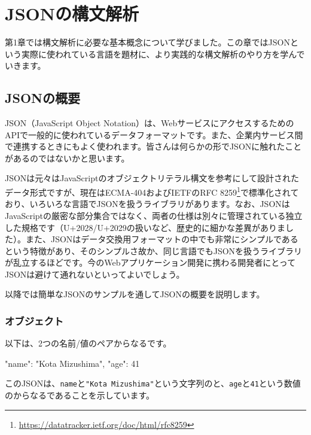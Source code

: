 \thispagestyle{empty}
\chapter{JSONの構文解析}\label{ch02}

第1章では構文解析に必要な基本概念について学びました。この章ではJSONという実際に使われている言語を題材に、より実践的な構文解析のやり方を学んでいきます。

\section{JSONの概要}

JSON（JavaScript Object
Notation）は、WebサービスにアクセスするためのAPIで一般的に使われているデータフォーマットです。また、企業内サービス間で連携するときにもよく使われます。皆さんは何らかの形でJSONに触れたことがあるのではないかと思います。

JSONは元々はJavaScriptのオブジェクトリテラル構文を参考にして設計されたデータ形式ですが、現在はECMA-404およびIETFのRFC 8259\footnote{\url{https://datatracker.ietf.org/doc/html/rfc8259}}で標準化されており、いろいろな言語でJSONを扱うライブラリがあります。なお、JSONはJavaScriptの厳密な部分集合ではなく、両者の仕様は別々に管理されている独立した規格です（U+2028/U+2029の扱いなど、歴史的に細かな差異がありました）。また、JSONはデータ交換用フォーマットの中でも非常にシンプルであるという特徴があり、そのシンプルさ故か、同じ言語でもJSONを扱うライブラリが乱立するほどです。今のWebアプリケーション開発に携わる開発者にとってJSONは避けて通れないといってよいでしょう。

以降では簡単なJSONのサンプルを通してJSONの概要を説明します。

\subsection{オブジェクト}

以下は、2つの名前/値のペアからなるです。

\begin{codescreen}{}
{
  "name": "Kota Mizushima",
  "age":  41
}
\end{codescreen}

このJSONは、\texttt{name}と\texttt{"Kota\ Mizushima"}という文字列のと、\texttt{age}と\texttt{41}という数値のからなるであることを示しています。

